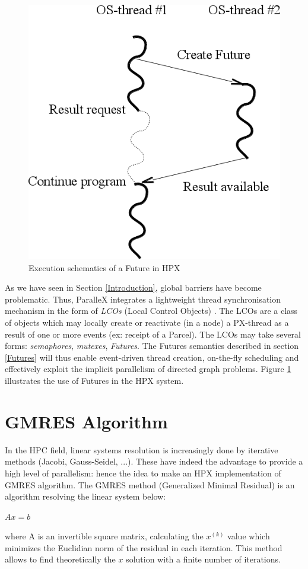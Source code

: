 \documentclass{llncs}
\begin{document}
\begin{figure}[h]
\begin{center}
\includegraphics[scale=0.4]{Images/Im5.png}
\end{center}
\caption{Execution schematics of a Future in HPX}
\label{hpxthread}
\end{figure}

As we have seen in Section \ref{Introduction}, global barriers have become
problematic. Thus, ParalleX integrates a lightweight thread synchronisation
mechanism in the form of \emph{LCOs} (Local Control Objects) \cite{ParalleX}.
The LCOs are a class of objects which may locally create or reactivate (in a
node) a PX-thread as a result of one or more events (ex: receipt of a Parcel).
The LCOs may take several forms: \emph{semaphores}, \emph{mutexes},
\emph{Futures}. The Futures semantics described in section \ref{Futures} will
thus enable event-driven thread creation, on-the-fly scheduling and effectively
exploit the implicit parallelism of directed graph problems. Figure
\ref{hpxthread} illustrates the use of Futures in the HPX system.

\section{GMRES Algorithm}\label{GMRES}
In the HPC field, linear systems resolution is increasingly done by iterative
methods \cite{Methodes} (Jacobi, Gauss-Seidel, ...). These have indeed the
advantage to provide a high level of parallelism: hence the idea to make an HPX
implementation of GMRES algorithm. The GMRES method (Generalized Minimal
Residual) \cite{GMRES} is an algorithm resolving the linear system below:
\begin{center}
  $Ax=b$
\end{center}
where A is an invertible square matrix, calculating the $x^{(k)}$ value which
minimizes the Euclidian norm of the residual in each iteration. This method
allows to find theoretically the $x$ solution with a finite number of iterations.
\end{document}

